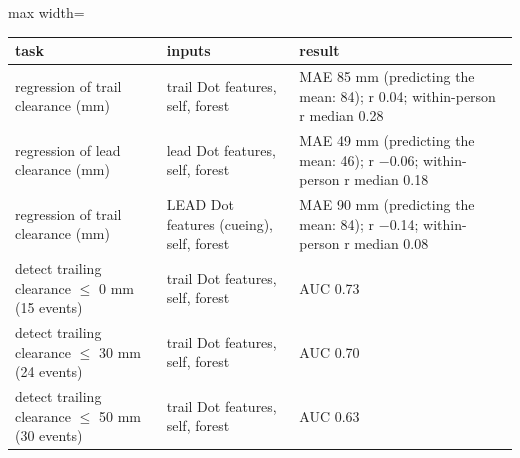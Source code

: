 \begin{adjustbox}{max width=\textwidth}
{\footnotesize
\begin{tabular}{p{4.6cm}p{4cm}p{6.2cm}}
\toprule
\textbf{task} & \textbf{inputs} & \textbf{result} \\
\midrule
regression of trail clearance (mm) & trail Dot features, self, forest & MAE 85 mm (predicting the mean: 84); r 0.04; within-person r median 0.28 \\
regression of lead clearance (mm) & lead Dot features, self, forest & MAE 49 mm (predicting the mean: 46); r $-$0.06; within-person r median 0.18 \\
regression of trail clearance (mm) & LEAD Dot features (cueing), self, forest & MAE 90 mm (predicting the mean: 84); r $-$0.14; within-person r median 0.08 \\
detect trailing clearance $\leq$ 0 mm (15 events) & trail Dot features, self, forest & AUC 0.73 \\
detect trailing clearance $\leq$ 30 mm (24 events) & trail Dot features, self, forest & AUC 0.70 \\
detect trailing clearance $\leq$ 50 mm (30 events) & trail Dot features, self, forest & AUC 0.63 \\
\bottomrule
\end{tabular}
}
\end{adjustbox}
